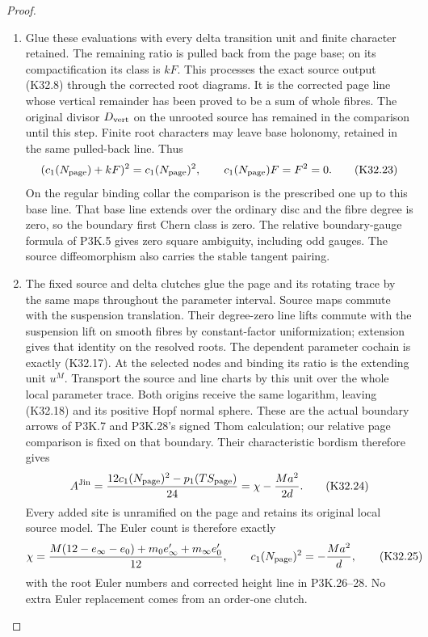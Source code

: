 \begin{proof}
\begin{enumerate}[label=\arabic*.]
\item Glue these evaluations with every delta transition
unit and finite character retained. The remaining
ratio is pulled back from the page base; on its
compactification its class is $kF$. This processes
the exact source output (K32.8) through the corrected
root diagrams. It is the corrected page line whose
vertical remainder has been proved to be a sum of
whole fibres. The original divisor $D_{\rm vert}$
on the unrooted source has remained in the
comparison until this step. Finite root characters
may leave base holonomy, retained in the same
pulled-back line. Thus
\[
 (c_1(N_{\rm page})+kF)^2=c_1(N_{\rm page})^2,\qquad
               c_1(N_{\rm page})F=F^2=0.               \tag{K32.23}
\]
On the regular binding collar the comparison is
the prescribed one up to this base line. That
base line extends over the ordinary disc and
the fibre degree is zero, so the boundary first
Chern class is zero. The relative boundary-gauge
formula of P3K.5 gives zero square ambiguity,
including odd gauges. The source diffeomorphism
also carries the stable tangent pairing.

\item The fixed source and delta clutches glue the page
and its rotating trace by the same maps throughout
the parameter interval. Source maps commute with
the suspension translation. Their degree-zero
line lifts commute with the suspension lift on
smooth fibres by constant-factor uniformization;
extension gives that identity on the resolved
roots. The dependent parameter cochain is exactly
(K32.17). At the selected nodes and binding its
ratio is the extending unit $u^M$. Transport the
source and line charts by this unit over the
whole local parameter trace. Both origins receive
the same logarithm, leaving (K32.18) and its
positive Hopf normal sphere. These are the actual
boundary arrows of P3K.7 and P3K.28's signed Thom
calculation; our relative page comparison is
fixed on that boundary. Their characteristic
bordism therefore gives
\[
 A^{\rm Jin}
 =\frac{12c_1(N_{\rm page})^2-p_1(TS_{\rm page})}{24}
 =\chi-\frac{Ma^2}{2d}.                               \tag{K32.24}
\]
Every added site is unramified on the page and
retains its original local source model. The
Euler count is therefore exactly
\[
 \chi=\frac{M(12-e_\infty-e_0)
                +m_0e_\infty'+m_\infty e_0'}{12},
 \qquad c_1(N_{\rm page})^2=-\frac{Ma^2}{d},             \tag{K32.25}
\]
with the root Euler numbers and corrected height
line in P3K.26--28. No extra Euler replacement
comes from an order-one clutch.


\end{enumerate}
\end{proof}
